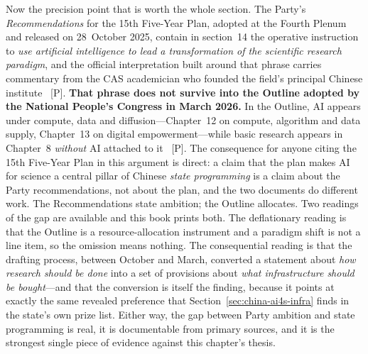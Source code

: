 Now the precision point that is worth the whole section. The Party's \emph{Recommendations} for the 15th Five-Year Plan, adopted at the Fourth Plenum and released on 28~October 2025, contain in section~14 the operative instruction to \emph{use artificial intelligence to lead a transformation of the scientific research paradigm}, and the official interpretation built around that phrase carries commentary from the CAS academician who founded the field's principal Chinese institute~\cite{fyp15-ai4s} [P]. \textbf{That phrase does not survive into the Outline adopted by the National People's Congress in March 2026.} In the Outline, AI appears under compute, data and diffusion---Chapter~12 on compute, algorithm and data supply, Chapter~13 on digital empowerment---while basic research appears in Chapter~8 \emph{without} AI attached to it~\cite{fyp15-ai4s} [P]. The consequence for anyone citing the 15th Five-Year Plan in this argument is direct: a claim that the plan makes AI for science a central pillar of Chinese \emph{state programming} is a claim about the Party recommendations, not about the plan, and the two documents do different work. The Recommendations state ambition; the Outline allocates. Two readings of the gap are available and this book prints both. The deflationary reading is that the Outline is a resource-allocation instrument and a paradigm shift is not a line item, so the omission means nothing. The consequential reading is that the drafting process, between October and March, converted a statement about \emph{how research should be done} into a set of provisions about \emph{what infrastructure should be bought}---and that the conversion is itself the finding, because it points at exactly the same revealed preference that Section~\ref{sec:china-ai4s-infra} finds in the state's own prize list. Either way, the gap between Party ambition and state programming is real, it is documentable from primary sources, and it is the strongest single piece of evidence against this chapter's thesis.


